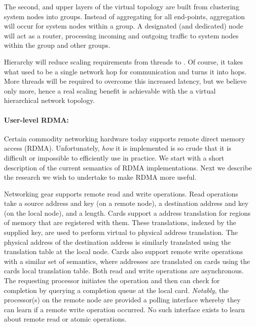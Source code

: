 The second, and upper layers of the virtual topology are built from clustering system nodes into groups.  Instead of aggregating for all end-points, aggregation will occur for system nodes within a group.  A designated (and dedicated) node will act as a router, processing incoming and outgoing traffic to system nodes within the group and other groups.


Hierarchy will reduce scaling requirements from  threads to .  Of course, it takes what used to be a single network hop for communication and turns it into  hops.  More threads will be required to overcome this increased latency, but we believe only  more, hence a real scaling benefit is achievable with the a virtual hierarchical network topology.

\paragraph{User-level RDMA:} Certain commodity networking hardware today supports remote direct memory access (RDMA).  Unfortunately, \emph{how} it is implemented is so crude that it is difficult or impossible to efficiently use in practice.  We start with a short description of the current semantics of RDMA implementations.  Next we describe the research we wish to undertake to make RDMA more useful.

Networking gear supports remote read and write operations.  Read operations take a source address and key (on a remote node), a destination address and key (on the local node), and a length.  Cards support a address translation for regions of memory that are registered with them.  These translations, indexed by the supplied key, are used to perform virtual to physical address translation.  The physical address of the destination address is similarly translated using the translation table at the local node.  Cards also support remote write operations with a similar set of semantics, where addresses are translated on cards using the cards local translation table.  Both read and write operations are asynchronous.  The requesting processor initiates the operation and then can check for completion by querying a completion queue at the local card.  \emph{Notably}, the processor(s) on the remote node are provided a polling interface whereby they can learn if a remote write operation occurred.  No such interface exists to learn about remote read or atomic operations.

